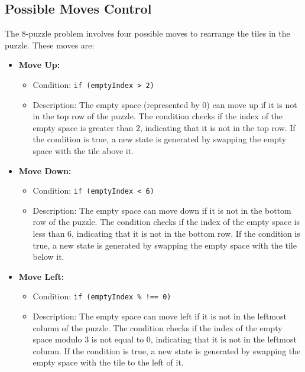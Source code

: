 \documentclass[12pt]{report}
\begin{document}
\subsection{Possible Moves Control}
    The 8-puzzle problem involves four possible moves to rearrange the tiles in the puzzle. These moves are:
    \begin{itemize}
        \item \textbf{Move Up:}
        \begin{itemize}
            \item Condition: \texttt{if (emptyIndex > 2)}
            \item Description: The empty space (represented by 0) can move up if it is not in the top row of the puzzle. The condition checks if the index of the empty space is greater than 2, indicating that it is not in the top row. If the condition is true, a new state is generated by swapping the empty space with the tile above it.
        \end{itemize}

        \item \textbf{Move Down:}
        \begin{itemize}
            \item Condition: \texttt{if (emptyIndex < 6)}
            \item Description: The empty space can move down if it is not in the bottom row of the puzzle. The condition checks if the index of the empty space is less than 6, indicating that it is not in the bottom row. If the condition is true, a new state is generated by swapping the empty space with the tile below it.
        \end{itemize}

        \item \textbf{Move Left:}
        \begin{itemize}
            \item Condition: \texttt{if (emptyIndex \% !== 0)}
            \item Description: The empty space can move left if it is not in the leftmost column of the puzzle. The condition checks if the index of the empty space modulo 3 is not equal to 0, indicating that it is not in the leftmost column. If the condition is true, a new state is generated by swapping the empty space with the tile to the left of it.
        \end{itemize}


\end{itemize}
\end{document}
